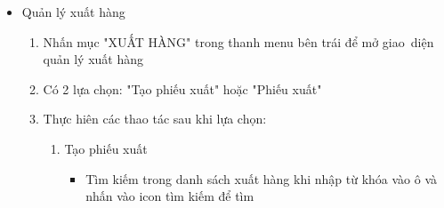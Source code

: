 \documentclass[a4paper,12pt]{report}
\begin{document}
\begin{itemize}
\begin{itemize}
\begin{enumerate}[label=B\arabic*:]
\begin{enumerate}[label=B3.\arabic*:]
\begin{itemize}
                                            \item Reset lại trang thì nhấn icon ở phía trên gần icon tìm kiếm
                                            \item Thêm sản phẩm nhập hàng: Nhấn nút "Thêm sản phẩm", hệ thống sẽ hiện thông tin sản phẩm sản phẩm cần nhập hàng sau đó nhấn nút "Lưu"
                                            \item Sửa số lượng: Chọn sản phẩm trong danh sách bên phải để chỉnh sửa
                                            \item Xóa sản phẩm: Chọn 1 dòng sản phẩm để xóa. Hệ thống sẽ xác nhận lại có xóa không, sau đó sẽ thực hiện xóa
                                            \item Nhập hàng: Khi nhấn nút "Nhập hàng" sẽ hệ sẽ xác nhận và thực hiện nhập hàng
                                        \end{itemize}
                                  \item Phiếu nhập
                                        \begin{itemize}
                                            \item Tìm kiếm phiếu nhập cần xem và nhấn icon tìm kiếm
                                            \item Chọn 1 dòng phiếu nhập thông tin chi tiết của phiếu nhập sẽ hiện ở phía bên phải để xác nhận trạng thái "Đã xác nhận" hoặc "Đã nhận hàng"
                                        \end{itemize}
                              \end{enumerate}
                    \end{enumerate}
              \item Quản lý xuất hàng
              \begin{enumerate}[label=B\arabic*:]
                \item Nhấn mục "XUẤT HÀNG" trong thanh menu bên trái để mở giao~diện quản lý xuất hàng
                \item Có 2 lựa chọn: "Tạo phiếu xuất" hoặc "Phiếu xuất"
                \item Thực hiên các thao tác sau khi lựa chọn:
                      \begin{enumerate}[label=B3.\arabic*:]
                          \item Tạo phiếu xuất
                                \begin{itemize}
                                    \item Tìm kiếm trong danh sách xuất hàng khi nhập từ khóa vào ô và nhấn vào icon tìm kiếm để tìm

\end{itemize}
\end{enumerate}
\end{enumerate}
\end{itemize}
\end{itemize}
\end{document}
